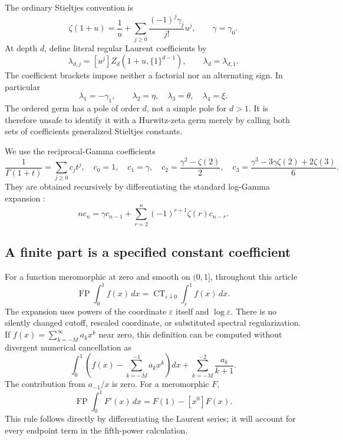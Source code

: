 \documentclass[11pt,a4paper]{article}
\numberwithin{equation}{section}
\theoremstyle{definition}
\DeclareMathOperator{\FP}{FP}
\DeclareMathOperator{\CT}{CT}
\begin{document}
The ordinary Stieltjes convention is
\begin{equation}\label{eq:stieltjes}
 \zeta(1+u)=\frac1u+
 \sum_{j\ge0}\frac{(-1)^j\gamma_j}{j!}u^j,
 \qquad \gamma=\gamma_0.
\end{equation}
At depth $d$, define literal regular Laurent coefficients by
\begin{equation}\label{eq:lambdadef}
 \lambda_{d,j}=[u^j]Z_d(1+u,\{1\}^{d-1}),\qquad
 \lambda_d=\lambda_{d,1}.
\end{equation}
The coefficient brackets impose neither a factorial nor an alternating
sign. In particular
\[
 \lambda_1=-\gamma_1,\qquad
 \lambda_2=\eta,\quad\lambda_3=\theta,\quad\lambda_4=\xi.
\]
The ordered germ has a pole of order $d$, not a simple pole for $d>1$.
It is therefore unsafe to identify it with a Hurwitz-zeta germ merely
by calling both sets of coefficients generalized Stieltjes constants.

We use the reciprocal-Gamma coefficients
\begin{equation}\label{eq:cdef}
 \frac1{\Gamma(1+t)}=\sum_{j\ge0}c_jt^j,
 \quad c_0=1,\quad c_1=\gamma,\quad
 c_2=\frac{\gamma^2-\zeta(2)}2,\quad
 c_3=\frac{\gamma^3-3\gamma\zeta(2)+2\zeta(3)}6.
\end{equation}
They are obtained recursively by differentiating the standard
log-Gamma expansion \cite{DLMF}:
\begin{equation}\label{eq:crecurrence}
 n c_n=\gamma c_{n-1}
       +\sum_{r=2}^n(-1)^{r+1}\zeta(r)c_{n-r}.
\end{equation}

\subsection{A finite part is a specified constant coefficient}

For a function meromorphic at zero and smooth on $(0,1]$, throughout
this article
\begin{equation}\label{eq:fpdef}
 \FP\int_0^1f(x)\,dx
 =\CT_{\varepsilon\downarrow0}\int_\varepsilon^1f(x)\,dx.
\end{equation}
The expansion uses powers of the coordinate $\varepsilon$ itself and
$\log\varepsilon$. There is no silently changed cutoff, rescaled
coordinate, or substituted spectral regularization. If
$f(x)=\sum_{k=-M}^{\infty}a_kx^k$ near zero, this definition can be
computed without divergent numerical cancellation as
\begin{equation}\label{eq:fpsubtraction}
 \int_0^1\left(f(x)-\sum_{k=-M}^{-1}a_kx^k\right)dx
       +\sum_{k=-M}^{-2}\frac{a_k}{k+1}.
\end{equation}
The contribution from $a_{-1}/x$ is zero. For a meromorphic $F$,
\begin{equation}\label{eq:fpderivative}
 \FP\int_0^1F'(x)\,dx=F(1)-[x^0]F(x).
\end{equation}
This rule follows directly by differentiating the Laurent series; it
will account for every endpoint term in the fifth-power calculation.
\end{document}
